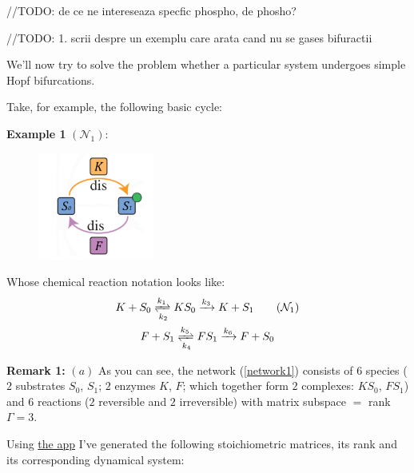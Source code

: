 \hfill\break
//TODO: de ce ne intereseaza specfic phospho, de phosho?
\hfill\break

\hfill\break
//TODO: 1. scrii despre un exemplu care arata cand nu se gases bifuractii
\hfill\break

We'll now try to solve the problem whether a particular system undergoes simple Hopf bifurcations.

Take, for example, the following basic cycle:

\textbf{Example 1} $(\mathcal{N}_1)$:
\begin{figure}[h]
	\includegraphics[width=38mm]{math_pics/ex1-no-bifurcations.png}	
	\centering
\end{figure}

Whose chemical reaction notation looks like:
\begin{gather}\label{network1}
	K + S_0 \xrightleftharpoons[k_2]{k_1} K S_0 \xrightarrow{k_3} K + S_1 \tag{$\mathcal{N}_1$} \\
	F + S_1 \xrightleftharpoons[k_4]{k_5} F S_1 \xrightarrow{k_6} F + S_0 \notag
\end{gather}

\textbf{Remark 1:} $(a)$ As you can see, the network (\ref{network1}) consists of $6$ species ($2$ substrates $S_0$, $S_1$; $2$ enzymes $K$, $F$; which together form $2$ complexes: $K S_0$, $F S_1$) and $6$ reactions ($2$ reversible and $2$ irreversible) with matrix subspace $=$ rank $\Gamma = 3$.

Using \href{https://github.com/viktorashi/Open-CoNtRol}{the app} I've generated the following stoichiometric matrices, its rank and its corresponding dynamical system:

